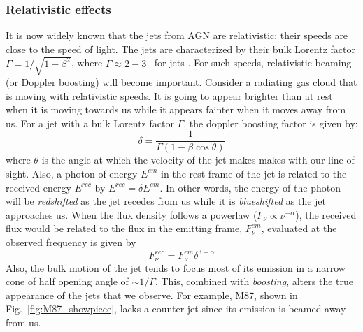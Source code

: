 \subsubsection{Relativistic effects\label{subsec:relativistic_effects}}
It is now widely known that the jets from AGN are relativistic: their speeds are close to the speed of light. The jets are characterized by their bulk Lorentz factor $\Gamma=1/\sqrt{1-\beta^2}$, where $\Gamma\approx2-3$~ for jets \citep[e.g.,][]{wardle1997fast}. For such speeds, relativistic beaming (or Doppler boosting) will become important. Consider a radiating gas cloud that is moving with relativistic speeds. It is going to appear brighter than at rest when it is moving towards us while it appears fainter when it moves away from us. For a jet with a bulk Lorentz factor $\Gamma$, the doppler boosting factor is given by:
\begin{equation}
    \delta = \frac{1}{\Gamma(1-\beta\cos{\theta})}
\end{equation}
where $\theta$ is the angle at which the velocity of the jet makes makes with our line of sight. 
Also, a photon of energy $E^{em}$ in the rest frame of the jet is related to the received energy $E^{rec}$ by $E^{rec}= \delta E^{em}$. 
 In other words, the energy of the photon will be \textit{redshifted} as the jet recedes from us while it is \textit{blueshifted} as the jet approaches us. 
When the flux density follows a powerlaw ($F_\nu\propto\nu^{-\alpha}$), the received flux would be related to the flux in the emitting frame, $F^{em}_{{\nu}}$, evaluated at the observed frequency is given by
\begin{equation}\label{eq:flux}
    F^{rec}_{\nu}=F^{em}_{{\nu}}\delta^{3+\alpha}
\end{equation}
Also, the bulk motion of the jet tends to focus most of its emission in a narrow cone of half opening angle of $\sim1/\Gamma$. This, combined with \textit{boosting}, alters the true appearance of the jets that we observe. For example, M87, shown in Fig.~\ref{fig:M87_showpiece}, lacks a counter jet since its emission is beamed away from us.

